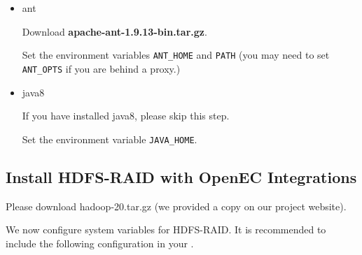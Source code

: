 \documentclass[letterpaper,12pt]{article}
\begin{document}
\begin{itemize}

\item ant  

Download {\bf apache-ant-1.9.13-bin.tar.gz}.

\begin{center}
\noindent{}
\end{center}

Set the environment variables {\tt ANT\_HOME} and {\tt PATH} (you may need to
set {\tt ANT\_OPTS} if you are behind a proxy.)

\begin{center}
\noindent{}
\end{center}

\item java8

If you have installed java8, please skip this step.

\begin{center}
\noindent{}
\end{center}

Set the environment variable {\tt JAVA\_HOME}.

\end{itemize}

\subsection{Install HDFS-RAID with OpenEC Integrations}

Please download hadoop-20.tar.gz (we provided a copy on our project website).

\begin{center}
\noindent{}
\end{center}

We now configure system variables for HDFS-RAID. It is recommended to include the following
configuration in your .
\end{document}
